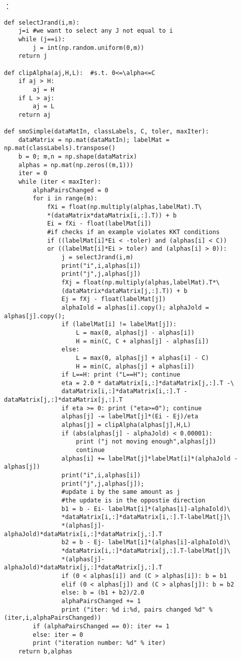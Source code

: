 ：
\begin{lstlisting}
def selectJrand(i,m):
    j=i #we want to select any J not equal to i
    while (j==i):
        j = int(np.random.uniform(0,m))
    return j

def clipAlpha(aj,H,L):  #s.t. 0<=\alpha<=C
    if aj > H:
        aj = H
    if L > aj:
        aj = L
    return aj

def smoSimple(dataMatIn, classLabels, C, toler, maxIter):
    dataMatrix = np.mat(dataMatIn); labelMat = np.mat(classLabels).transpose()
    b = 0; m,n = np.shape(dataMatrix)
    alphas = np.mat(np.zeros((m,1)))
    iter = 0
    while (iter < maxIter):
        alphaPairsChanged = 0
        for i in range(m):
            fXi = float(np.multiply(alphas,labelMat).T\
            *(dataMatrix*dataMatrix[i,:].T)) + b
            Ei = fXi - float(labelMat[i])
            #if checks if an example violates KKT conditions
            if ((labelMat[i]*Ei < -toler) and (alphas[i] < C))
            or ((labelMat[i]*Ei > toler) and (alphas[i] > 0)):
                j = selectJrand(i,m)
                print("i",i,alphas[i])
                print("j",j,alphas[j])
                fXj = float(np.multiply(alphas,labelMat).T*\
                (dataMatrix*dataMatrix[j,:].T)) + b
                Ej = fXj - float(labelMat[j])
                alphaIold = alphas[i].copy(); alphaJold = alphas[j].copy();
                if (labelMat[i] != labelMat[j]):
                    L = max(0, alphas[j] - alphas[i])
                    H = min(C, C + alphas[j] - alphas[i])
                else:
                    L = max(0, alphas[j] + alphas[i] - C)
                    H = min(C, alphas[j] + alphas[i])
                if L==H: print ("L==H"); continue
                eta = 2.0 * dataMatrix[i,:]*dataMatrix[j,:].T -\
                dataMatrix[i,:]*dataMatrix[i,:].T - dataMatrix[j,:]*dataMatrix[j,:].T
                if eta >= 0: print ("eta>=0"); continue
                alphas[j] -= labelMat[j]*(Ei - Ej)/eta
                alphas[j] = clipAlpha(alphas[j],H,L)
                if (abs(alphas[j] - alphaJold) < 0.00001):
                    print ("j not moving enough",alphas[j])
                    continue
                alphas[i] += labelMat[j]*labelMat[i]*(alphaJold - alphas[j])
                print("i",i,alphas[i])
                print("j",j,alphas[j]);
                #update i by the same amount as j
                #the update is in the oppostie direction
                b1 = b - Ei- labelMat[i]*(alphas[i]-alphaIold)\
                *dataMatrix[i,:]*dataMatrix[i,:].T-labelMat[j]\
                *(alphas[j]-alphaJold)*dataMatrix[i,:]*dataMatrix[j,:].T
                b2 = b - Ej- labelMat[i]*(alphas[i]-alphaIold)\
                *dataMatrix[i,:]*dataMatrix[j,:].T-labelMat[j]\
                *(alphas[j]-alphaJold)*dataMatrix[j,:]*dataMatrix[j,:].T
                if (0 < alphas[i]) and (C > alphas[i]): b = b1
                elif (0 < alphas[j]) and (C > alphas[j]): b = b2
                else: b = (b1 + b2)/2.0
                alphaPairsChanged += 1
                print ("iter: %d i:%d, pairs changed %d" % (iter,i,alphaPairsChanged))
        if (alphaPairsChanged == 0): iter += 1
        else: iter = 0
        print ("iteration number: %d" % iter)
    return b,alphas


\end{lstlisting}
